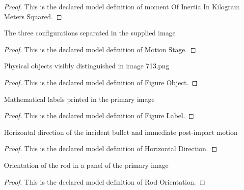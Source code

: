 \begin{proof}
  This is the declared model definition of moment Of Inertia In Kilogram Meters Squared.
\end{proof}
\begin{definition}
  \label{def:physics:phyx-mini-0713:phyxminiproblems-problemphyxmini0713-motionstage}
  The three configurations separated in the supplied image
\end{definition}
\begin{proof}
  This is the declared model definition of Motion Stage.
\end{proof}
\begin{definition}
  \label{def:physics:phyx-mini-0713:phyxminiproblems-problemphyxmini0713-figureobject}
  Physical objects visibly distinguished in image 713.png
\end{definition}
\begin{proof}
  This is the declared model definition of Figure Object.
\end{proof}
\begin{definition}
  \label{def:physics:phyx-mini-0713:phyxminiproblems-problemphyxmini0713-figurelabel}
  Mathematical labels printed in the primary image
\end{definition}
\begin{proof}
  This is the declared model definition of Figure Label.
\end{proof}
\begin{definition}
  \label{def:physics:phyx-mini-0713:phyxminiproblems-problemphyxmini0713-horizontaldirection}
  Horizontal direction of the incident bullet and immediate post-impact motion
\end{definition}
\begin{proof}
  This is the declared model definition of Horizontal Direction.
\end{proof}
\begin{definition}
  \label{def:physics:phyx-mini-0713:phyxminiproblems-problemphyxmini0713-rodorientation}
  Orientation of the rod in a panel of the primary image
\end{definition}
\begin{proof}
  This is the declared model definition of Rod Orientation.
\end{proof}
